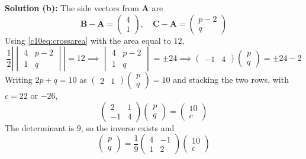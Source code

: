 \textbf{Solution (b):} The side vectors from $\mathbf{A}$ are
\begin{equation}
\mathbf{B} - \mathbf{A} = \begin{pmatrix} 4 \\ 1 \end{pmatrix}, \quad
\mathbf{C} - \mathbf{A} = \begin{pmatrix} p - 2 \\ q \end{pmatrix}
\end{equation}
Using \eqref{c10eq:crossarea} with the area equal to $12$,
\begin{equation}
\frac{1}{2}\left|\begin{vmatrix} 4 & p - 2 \\ 1 & q \end{vmatrix}\right| = 12 \implies
\begin{vmatrix} 4 & p - 2 \\ 1 & q \end{vmatrix} = \pm 24 \implies
\begin{pmatrix} -1 & 4 \end{pmatrix}\begin{pmatrix} p \\ q \end{pmatrix} = \pm 24 - 2
\end{equation}
Writing $2p + q = 10$ as $\begin{pmatrix} 2 & 1 \end{pmatrix}\begin{pmatrix} p \\ q \end{pmatrix} = 10$ and stacking the two rows, with $c = 22$ or $-26$,
\begin{equation}
\begin{pmatrix} 2 & 1 \\ -1 & 4 \end{pmatrix}\begin{pmatrix} p \\ q \end{pmatrix} = \begin{pmatrix} 10 \\ c \end{pmatrix}
\end{equation}
The determinant is $9$, so the inverse exists and
\begin{equation}
\begin{pmatrix} p \\ q \end{pmatrix} = \frac{1}{9}\begin{pmatrix} 4 & -1 \\ 1 & 2 \end{pmatrix}\begin{pmatrix} 10 \\ c \end{pmatrix}
\end{equation}
